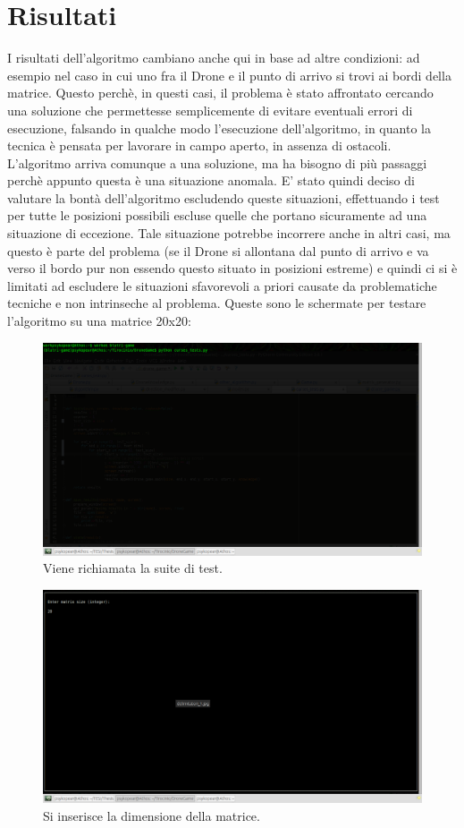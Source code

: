 \section{Risultati}
I risultati dell'algoritmo cambiano anche qui in base ad altre condizioni: ad esempio nel caso in cui uno fra il Drone e il punto di arrivo si trovi ai bordi della matrice. Questo perchè, in questi casi, il problema è stato affrontato cercando una soluzione che permettesse semplicemente di evitare eventuali errori di esecuzione, falsando in qualche modo l'esecuzione dell'algoritmo, in quanto la tecnica è pensata per lavorare in campo aperto, in assenza di ostacoli. L'algoritmo arriva comunque a una soluzione, ma ha bisogno di più passaggi perchè appunto questa è una situazione anomala. E' stato quindi deciso di valutare la bontà dell'algoritmo escludendo queste situazioni, effettuando i test per tutte le posizioni possibili escluse quelle che portano sicuramente ad una situazione di eccezione. Tale situazione potrebbe incorrere anche in altri casi, ma questo è parte del problema (se il Drone si allontana dal punto di arrivo e va verso il bordo pur non essendo questo situato in posizioni estreme) e quindi ci si è limitati ad escludere le situazioni sfavorevoli a priori causate da problematiche tecniche e non intrinseche al problema.
Queste sono le schermate per testare l'algoritmo su una matrice 20x20:
\begin{figure}[hb]
\center
\includegraphics[width=\textwidth]{immagini/Test1.png}
\caption{Viene richiamata la suite di test.}
\end{figure}

\begin{figure}[hb]
\center
\includegraphics[width=\textwidth]{immagini/Test1-1.png}
\caption{Si inserisce la dimensione della matrice.}
\end{figure}

